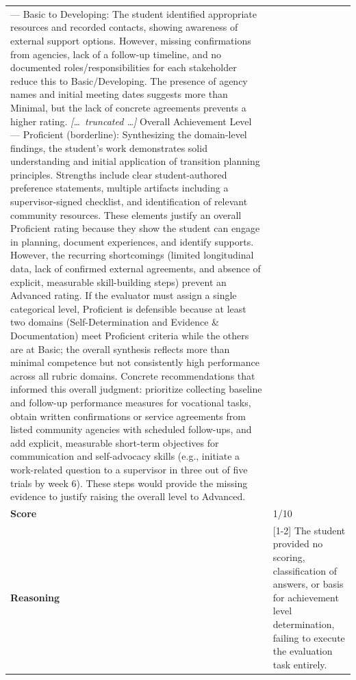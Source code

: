 \begin{longtable}{@{}l p{13cm}@{}}
--- Basic to Developing: The student identified appropriate resources and recorded contacts, showing awareness of external support options. However, missing confirmations from agencies, lack of a follow-up timeline, and no documented roles/responsibilities for each stakeholder reduce this to Basic/Developing. The presence of agency names and initial meeting dates suggests more than Minimal, but the lack of concrete agreements prevents a higher rating. \newline \textit{[\ldots\ truncated \ldots]} \newline Overall Achievement Level --- Proficient (borderline): Synthesizing the domain-level findings, the student's work demonstrates solid understanding and initial application of transition planning principles. Strengths include clear student-authored preference statements, multiple artifacts including a supervisor-signed checklist, and identification of relevant community resources. These elements justify an overall Proficient rating because they show the student can engage in planning, document experiences, and identify supports. \newline However, the recurring shortcomings (limited longitudinal data, lack of confirmed external agreements, and absence of explicit, measurable skill-building steps) prevent an Advanced rating. If the evaluator must assign a single categorical level, Proficient is defensible because at least two domains (Self-Determination and Evidence \& Documentation) meet Proficient criteria while the others are at Basic; the overall synthesis reflects more than minimal competence but not consistently high performance across all rubric domains. \newline Concrete recommendations that informed this overall judgment: prioritize collecting baseline and follow-up performance measures for vocational tasks, obtain written confirmations or service agreements from listed community agencies with scheduled follow-ups, and add explicit, measurable short-term objectives for communication and self-advocacy skills (e.g., initiate a work-related question to a supervisor in three out of five trials by week 6). These steps would provide the missing evidence to justify raising the overall level to Advanced.      \\
  \textbf{Score}     & 1/10  \\
  \textbf{Reasoning} & [1-2] The student provided no scoring, classification of answers, or basis for achievement level determination, failing to execute the evaluation task entirely.  \\

\end{longtable}
